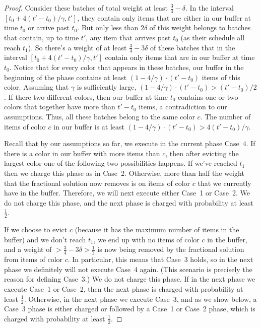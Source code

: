 \documentclass[12pt]{article}
\begin{document}
\begin{proof}
Consider these
batches of total weight at least $\frac 3 4 - \delta$. In the
interval $[t_0+4(t'-t_0)/\gamma,t']$, they contain only items
that are either in our buffer at time $t_0$ or arrive past $t_0$.
But only less than $2\delta$ of this weight belongs to batches
that contain, up to time $t'$, any item that arrives past $t_0$
(as their schedule all reach $t_1$). So there's a weight of at least
$\frac 3 4 - 3\delta$ of these batches that in the interval
$[t_0+4(t'-t_0)/\gamma,t']$ contain only items that are in our
buffer at time $t_0$. Notice that for every color that appears
in these batches, our buffer in the beginning of the phase
contains at least $(1 - 4/\gamma)\cdot(t'-t_0)$ items of this
color. Assuming that $\gamma$ is sufficiently
large, $(1 - 4/\gamma)\cdot(t'-t_0) > (t' - t_0) / 2$. 
If there two different colors, then our buffer at 
time $t_0$ contains one or two colors that together have more
than $t' - t_0$ items, a contradiction to our assumptions.
Thus, all these batches belong to the same color $c$. The number
of items of color $c$ in our buffer is at least 
$(1 - 4/\gamma)\cdot(t'-t_0) > 4(t'-t_0)/\gamma$. 

Recall that by our assumptions so far, we execute in the
current phase Case~4.
If there is a color in our buffer with more items than $c$, 
then after evicting the largest color one of the following
two possibilities happens. If we've reached $t_1$ then we
charge this phase as in Case~2. Otherwise, more than half 
the weight that the fractional solution now removes is on
items of color $c$ that we currently have in the buffer. 
Therefore, we will next execute either Case~1 or Case~2.
We do not charge this phase,
and the next phase is charged with probability at least 
$\frac 1 2$.

If we choose to evict $c$ (because it has the maximum
number of items in the buffer) and we don't reach $t_1$, 
we end up with no items of color $c$ in the buffer, and a
weight of $>\frac 3 4 - 3\delta > \frac 1 2$ is now
being removed by the fractional solution from items of
color $c$. In particular, this means that Case~3 holds, so
in the next phase we definitely will not execute Case~4 again.
(This scenario is precisely the reason for defining Case~3.)
We do not charge this phase. If in the next phase we execute 
Case~1 or Case~2, then the next phase is charged with 
probability at least $\frac 1 2$. Otherwise, in the next
phase we execute Case~3, and as we show below, a Case~3 
phase is either charged or followed by a Case~1 or Case~2 
phase, which is charged with probability at least $\frac 1 2$.


\end{proof}
\end{document}

